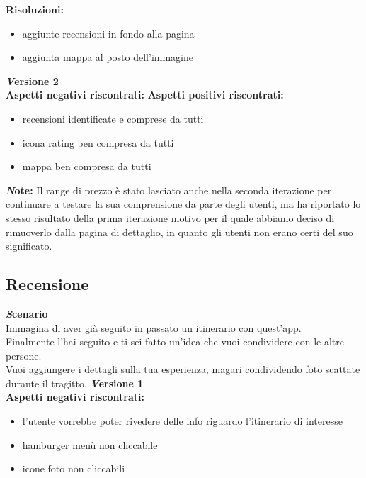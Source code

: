 \textbf{Risoluzioni:}
\begin{itemize}[label=-]

\item aggiunte recensioni in fondo alla pagina
\item aggiunta mappa al posto dell’immagine

\end{itemize}

\textbf{\emph Versione 2}\\
\textbf{Aspetti negativi riscontrati:}
\newline\newline
\textbf{Aspetti positivi riscontrati:}
\begin{itemize}[label=-]

\item recensioni identificate e comprese da tutti
\item icona rating ben compresa da tutti
\item mappa ben compresa da tutti

\end{itemize}

\textbf{\emph Note:} Il range di prezzo è stato lasciato anche nella seconda iterazione per continuare a testare la sua comprensione da parte degli utenti, ma ha riportato lo stesso risultato della prima iterazione motivo per il quale abbiamo deciso di rimuoverlo dalla pagina di dettaglio, in quanto gli utenti non erano certi del suo significato. \\



\subsection{Recensione}
\textbf{\emph Scenario}\\
Immagina di aver già seguito in passato un itinerario con quest'app.\\
Finalmente l'hai seguito e ti sei fatto un'idea che vuoi condividere con le altre
persone.\\
Vuoi aggiungere i dettagli sulla tua esperienza, magari condividendo foto scattate
durante il tragitto.
\newline
\textbf{\emph Versione 1}\\
\textbf{Aspetti negativi riscontrati:}
\begin{itemize}[label=-]

\item l'utente vorrebbe poter rivedere delle info riguardo l'itinerario di interesse
\item hamburger menù non cliccabile
\item icone foto non cliccabili

\end{itemize}

